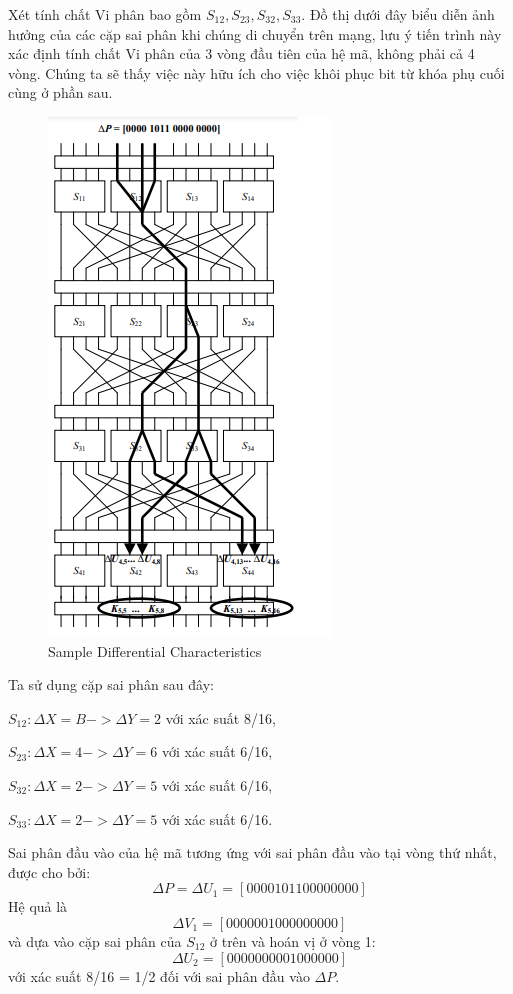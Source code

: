 Xét tính chất Vi phân bao gồm $S_{12}, S_{23}, S_{32}, S_{33}.$ Đồ thị dưới đây biểu diễn ảnh hưởng của các cặp sai phân khi chúng di chuyển trên mạng, 
lưu ý tiến trình này xác định tính chất Vi phân của 3 vòng đầu tiên của hệ mã, không phải cả 4 vòng. Chúng ta sẽ thấy việc này hữu ích cho việc khôi phục bit từ khóa phụ cuối cùng ở phần sau. 
\begin{figure}[H]
    \centering
    \includegraphics[scale=0.9]{Các công cụ và kĩ thuật sử dụng trong tấn công/spn1.png}
    
    \caption{Sample Differential Characteristics}
\end{figure}

Ta sử dụng cặp sai phân sau đây:

$S_{12}: \Delta X = B -> \Delta Y = 2$ với xác suất 8/16,

$S_{23}: \Delta X = 4 -> \Delta Y = 6$ với xác suất 6/16,

$S_{32}: \Delta X = 2 -> \Delta Y = 5$ với xác suất 6/16,

$S_{33}: \Delta X = 2 -> \Delta Y = 5$ với xác suất 6/16.

Sai phân đầu vào của hệ mã tương ứng với sai phân đầu vào tại vòng thứ nhất, được cho bởi:
$$ \Delta P = \Delta U_1 = [0000 1011 0000 0000]$$
Hệ quả là
$$ \Delta V_1 = [0000 0010 0000 0000]$$
và dựa vào cặp sai phân của $S_{12}$ ở trên và hoán vị ở vòng 1:
$$ \Delta U_2 = [0000 0000 0100 0000]$$ 
với xác suất 8/16 = 1/2 đối với sai phân đầu vào $\Delta P$. 

